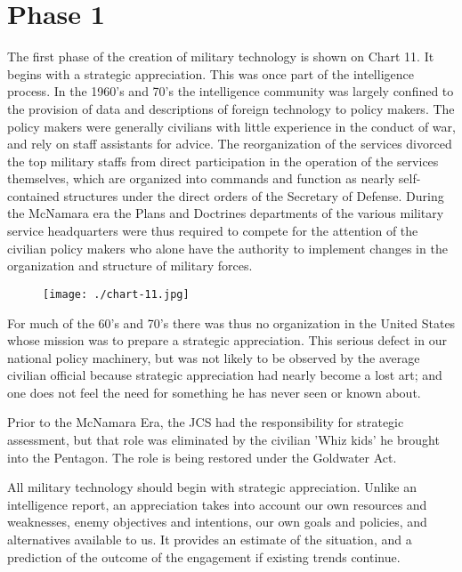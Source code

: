 \section{Phase 1}
The first phase of the creation of military technology is shown on Chart 11. It begins with a strategic appreciation. This was once part of the intelligence process. In the 1960's and 70's the intelligence community was largely confined to the provision of data and descriptions of foreign technology to policy makers. The policy makers were generally civilians with little experience in the conduct of war, and rely on staff assistants for advice. The reorganization of the services divorced the top military staffs from direct participation in the operation of the services themselves, which are organized into commands and function as nearly self-contained structures under the direct orders of the Secretary of Defense. During the McNamara era the Plans and Doctrines departments of the various military service headquarters were thus required to compete for the attention of the civilian policy makers who alone have the authority to implement changes in the organization and structure of military forces.

\begin{figure}
    \texttt{[image: ./chart-11.jpg]}
    \label{fig:chart-11}
\end{figure}

For much of the 60's and 70's there was thus no organization in the United States whose mission was to prepare a strategic appreciation. This serious defect in our national policy machinery, but was not likely to be observed by the average civilian official because strategic appreciation had nearly become a lost art; and one does not feel the need for something he has never seen or known about.

Prior to the McNamara Era, the JCS had the responsibility for strategic assessment, but that role was eliminated by the civilian 'Whiz kids' he brought into the Pentagon. The role is being restored under the Goldwater Act.

All military technology should begin with strategic appreciation. Unlike an intelligence report, an appreciation takes into account our own resources and weaknesses, enemy objectives and intentions, our own goals and policies, and alternatives available to us. It provides an estimate of the situation, and a prediction of the outcome of the engagement if existing trends continue.


